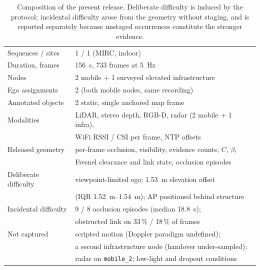 \begin{table}[t]
\centering
\caption{Composition of the present release. Deliberate difficulty is induced by
the protocol; incidental difficulty arose from the geometry without staging, and
is reported separately because unstaged occurrences constitute the stronger
evidence.}
\label{tab:inventory}
\small
\begin{tabular}{@{}ll@{}}
\toprule
Sequences / sites & 1 / 1 (MIRC, indoor) \\
Duration, frames & \SI{156}{\second}, \num{733} frames at \SI{5}{\hertz} \\
Nodes & 2 mobile + 1 surveyed elevated infrastructure \\
Ego assignments & 2 (both mobile nodes, same recording) \\
Annotated objects & 2 static, single anchored map frame \\
Modalities & LiDAR, stereo depth, RGB-D, radar (2 mobile + 1 infra), \\
          & WiFi RSSI / CSI per frame, NTP offsets \\
Released geometry & per-frame occlusion, visibility, evidence counts, $C$, $\beta$, \\
          & Fresnel clearance and link state, occlusion episodes \\
\midrule
Deliberate difficulty & viewpoint-limited ego; \SI{1.53}{\metre} elevation offset \\
          & (IQR \SIrange{1.52}{1.54}{\metre}); AP positioned behind structure \\
Incidental difficulty & 9 / 8 occlusion episodes (median \SI{18.8}{\second}); \\
          & obstructed link on 33\,\% / 18\,\% of frames \\
\midrule
Not captured & scripted motion (Doppler paradigm undefined); \\
          & a second infrastructure node (handover under-sampled); \\
          & radar on \texttt{mobile\_2}; low-light and dropout conditions \\
\bottomrule
\end{tabular}
\end{table}

